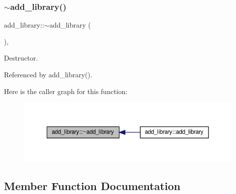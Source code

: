 \subsubsection{\texorpdfstring{$\sim$add\+\_\+library()}{~add\_library()}}
{\footnotesize\ttfamily add\+\_\+library\+::$\sim$add\+\_\+library (\begin{DoxyParamCaption}{ }\end{DoxyParamCaption})\hspace{0.3cm}{\ttfamily [override]}, {\ttfamily [default]}}



Destructor. 



Referenced by add\+\_\+library().

Here is the caller graph for this function\+:
\nopagebreak
\begin{figure}[H]
\begin{center}
\leavevmode
\includegraphics[width=350pt]{d6/d81/classadd__library_a9d78e992d068a1be66af1b3c49f7adcb_icgraph}
\end{center}
\end{figure}


\subsection{Member Function Documentation}
\mbox{\label{classadd__library_aecfd57b77ce6a35da898612dd02950a6}} 
